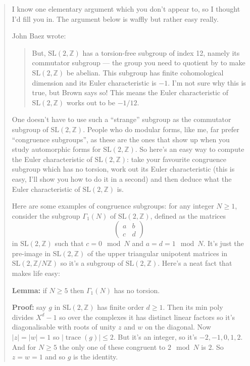 \documentclass{article}
\begin{document}
\begin{quote}
I know one elementary argument which you don't appear to, so I thought
I'd fill you in. The argument below is waffly but rather easy really.

John Baez wrote:

\begin{quote}
But, \(\mathrm{SL}(2,\mathbb{Z})\) has a torsion-free subgroup of index
12, namely its commutator subgroup --- the group you need to quotient by
to make \(\mathrm{SL}(2,\mathbb{Z})\) be abelian. This subgroup has
finite cohomological dimension and its Euler characteristic is \(-1\).
I'm not sure why this is true, but Brown says so! This means the Euler
characteristic of \(\mathrm{SL}(2,\mathbb{Z})\) works out to be
\(-1/12\).
\end{quote}

One doesn't have to use such a ``strange'' subgroup as the commutator
subgroup of \(\mathrm{SL}(2,\mathbb{Z})\). People who do modular forms,
like me, far prefer ``congruence subgroups'', as these are the ones that
show up when you study automorphic forms for
\(\mathrm{SL}(2,\mathbb{Z})\). So here's an easy way to compute the
Euler characteristic of \(\mathrm{SL}(2,\mathbb{Z})\): take your
favourite congruence subgroup which has no torsion, work out its Euler
characteristic (this is easy, I'll show you how to do it in a second)
and then deduce what the Euler characteristic of
\(\mathrm{SL}(2,\mathbb{Z})\) is.

Here are some examples of congruence subgroups: for any integer
\(N\geqslant1\), consider the subgroup \(\Gamma_1(N)\) of
\(\mathrm{SL}(2,\mathbb{Z})\), defined as the matrices \[
  \left(\begin{array}{cc}a&b\\c&d\end{array}\right)
\] in \(\mathrm{SL}(2,\mathbb{Z})\) such that \(c=0 \mod N\) and
\(a=d=1 \mod N\). It's just the pre-image in
\(\mathrm{SL}(2,\mathbb{Z})\) of the upper triangular unipotent matrices
in \(\mathrm{SL}(2,\mathbb{Z}/N\mathbb{Z})\) so it's a subgroup of
\(\mathrm{SL}(2,\mathbb{Z})\). Here's a neat fact that makes life easy:

\textbf{Lemma:} if \(N\geqslant5\) then \(\Gamma_1(N)\) has no torsion.

\textbf{Proof:} say \(g\) in \(\mathrm{SL}(2,\mathbb{Z})\) has finite
order \(d\geqslant1\). Then its min poly divides \(X^d-1\) so over the
complexes it has distinct linear factors so it's diagonalisable with
roots of unity \(z\) and \(w\) on the diagonal. Now \(|z|=|w|=1\) so
\(|\operatorname{trace}(g)| \leqslant 2\). But it's an integer, so it's
\(-2,-1,0,1,2\). And for \(N\geqslant5\) the only one of these congruent
to \(2 \mod N\) is \(2\). So \(z=w=1\) and so \(g\) is the identity.


\end{quote}
\end{document}
